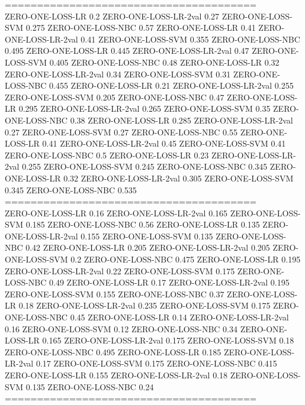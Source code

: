 \documentclass[12pt]{article}
\begin{document}
=======================================\\
ZERO-ONE-LOSS-LR 0.2
ZERO-ONE-LOSS-LR-2val 0.27
ZERO-ONE-LOSS-SVM 0.275
ZERO-ONE-LOSS-NBC 0.57
ZERO-ONE-LOSS-LR 0.41
ZERO-ONE-LOSS-LR-2val 0.41
ZERO-ONE-LOSS-SVM 0.355
ZERO-ONE-LOSS-NBC 0.495
ZERO-ONE-LOSS-LR 0.445
ZERO-ONE-LOSS-LR-2val 0.47
ZERO-ONE-LOSS-SVM 0.405
ZERO-ONE-LOSS-NBC 0.48
ZERO-ONE-LOSS-LR 0.32
ZERO-ONE-LOSS-LR-2val 0.34
ZERO-ONE-LOSS-SVM 0.31
ZERO-ONE-LOSS-NBC 0.455
ZERO-ONE-LOSS-LR 0.21
ZERO-ONE-LOSS-LR-2val 0.255
ZERO-ONE-LOSS-SVM 0.205
ZERO-ONE-LOSS-NBC 0.47
ZERO-ONE-LOSS-LR 0.295
ZERO-ONE-LOSS-LR-2val 0.265
ZERO-ONE-LOSS-SVM 0.35
ZERO-ONE-LOSS-NBC 0.38
ZERO-ONE-LOSS-LR 0.285
ZERO-ONE-LOSS-LR-2val 0.27
ZERO-ONE-LOSS-SVM 0.27
ZERO-ONE-LOSS-NBC 0.55
ZERO-ONE-LOSS-LR 0.41
ZERO-ONE-LOSS-LR-2val 0.45
ZERO-ONE-LOSS-SVM 0.41
ZERO-ONE-LOSS-NBC 0.5
ZERO-ONE-LOSS-LR 0.23
ZERO-ONE-LOSS-LR-2val 0.255
ZERO-ONE-LOSS-SVM 0.245
ZERO-ONE-LOSS-NBC 0.345
ZERO-ONE-LOSS-LR 0.32
ZERO-ONE-LOSS-LR-2val 0.305
ZERO-ONE-LOSS-SVM 0.345
ZERO-ONE-LOSS-NBC 0.535\\

=======================================\\

ZERO-ONE-LOSS-LR 0.16
ZERO-ONE-LOSS-LR-2val 0.165
ZERO-ONE-LOSS-SVM 0.185
ZERO-ONE-LOSS-NBC 0.56
ZERO-ONE-LOSS-LR 0.135
ZERO-ONE-LOSS-LR-2val 0.155
ZERO-ONE-LOSS-SVM 0.135
ZERO-ONE-LOSS-NBC 0.42
ZERO-ONE-LOSS-LR 0.205
ZERO-ONE-LOSS-LR-2val 0.205
ZERO-ONE-LOSS-SVM 0.2
ZERO-ONE-LOSS-NBC 0.475
ZERO-ONE-LOSS-LR 0.195
ZERO-ONE-LOSS-LR-2val 0.22
ZERO-ONE-LOSS-SVM 0.175
ZERO-ONE-LOSS-NBC 0.49
ZERO-ONE-LOSS-LR 0.17
ZERO-ONE-LOSS-LR-2val 0.195
ZERO-ONE-LOSS-SVM 0.155
ZERO-ONE-LOSS-NBC 0.37
ZERO-ONE-LOSS-LR 0.18
ZERO-ONE-LOSS-LR-2val 0.235
ZERO-ONE-LOSS-SVM 0.175
ZERO-ONE-LOSS-NBC 0.45
ZERO-ONE-LOSS-LR 0.14
ZERO-ONE-LOSS-LR-2val 0.16
ZERO-ONE-LOSS-SVM 0.12
ZERO-ONE-LOSS-NBC 0.34
ZERO-ONE-LOSS-LR 0.165
ZERO-ONE-LOSS-LR-2val 0.175
ZERO-ONE-LOSS-SVM 0.18
ZERO-ONE-LOSS-NBC 0.495
ZERO-ONE-LOSS-LR 0.185
ZERO-ONE-LOSS-LR-2val 0.17
ZERO-ONE-LOSS-SVM 0.175
ZERO-ONE-LOSS-NBC 0.415
ZERO-ONE-LOSS-LR 0.155
ZERO-ONE-LOSS-LR-2val 0.18
ZERO-ONE-LOSS-SVM 0.135
ZERO-ONE-LOSS-NBC 0.24\\

=======================================\\
\end{document}

